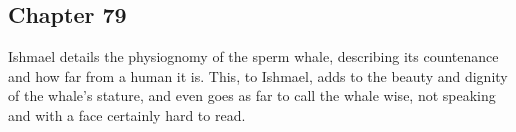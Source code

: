 \subsection{Chapter 79}

Ishmael details the physiognomy of the sperm whale, describing its countenance
and how far from a human it is. This, to Ishmael, adds to the beauty and
dignity of the whale's stature, and even goes as far to call the whale wise,
not speaking and with a face certainly hard to read.
